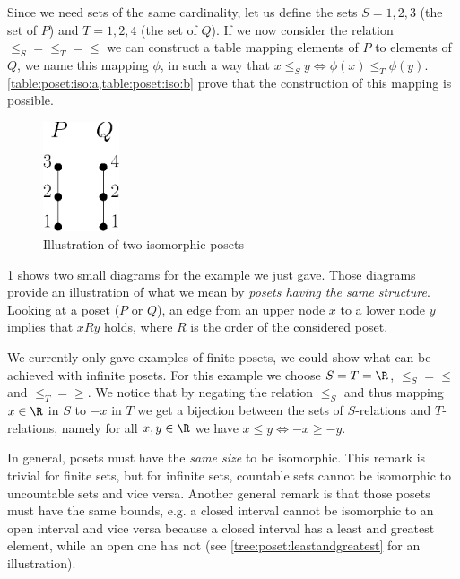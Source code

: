 Since we need sets of the same cardinality, let us define the sets $S = {1, 2,
3}$ (the set of $P$) and $T = {1, 2, 4}$ (the set of $Q$). If we now consider
the relation $\le_S = \le_T = \le$ we can construct a table mapping elements of
$P$ to elements of $Q$, we name this mapping $\phi$, in such a way that $x
\le_S y \iff \phi(x) \le_T \phi(y)$. \cref{table:poset:iso:a,table:poset:iso:b}
prove that the construction of this mapping is possible.

\begin{figure}
	\centering
	\includegraphics[width=0.2\textwidth]{fig/poset/iso/a}
	\caption{Illustration of two isomorphic posets}
	\label{fig:poset:iso:a}
\end{figure}

\ref{fig:poset:iso:a} shows two small diagrams for the example we just gave.
Those diagrams provide an illustration of what we mean by \emph{posets having
the same structure}. Looking at a poset ($P$ or $Q$), an edge from an upper
node $x$ to a lower node $y$ implies that $x R y$ holds, where $R$ is the order
of the considered poset.


We currently only gave examples of finite posets, we could show what can be
achieved with infinite posets. For this example we choose $S = T = \R$,
$\le_S = \le$ and $\le_T = \ge$. We notice that by negating the relation
$\le_S$ and thus mapping $x \in \R$ in $S$ to $-x$ in $T$ we get a
bijection between the sets of $S$-relations and $T$-relations, namely for all
$x, y \in \R$ we have $x \le y \iff -x \ge -y$.

In general, posets must have the \emph{same size} to be isomorphic. This remark
is trivial for finite sets, but for infinite sets, countable sets cannot be
isomorphic to uncountable sets and vice versa. Another general remark is that
those posets must have the same bounds, e.g. a closed interval cannot be
isomorphic to an open interval and vice versa because a closed interval has a
least and greatest element, while an open one has not (see
\ref{tree:poset:leastandgreatest} for an illustration).


